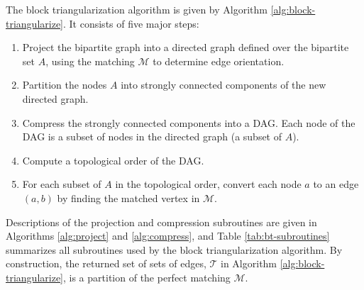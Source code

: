 \documentclass[smallextended]{svjour3}
\begin{document}
The block triangularization algorithm is given by Algorithm
\ref{alg:block-triangularize}. It consists of five major steps:
\begin{enumerate}
  \item Project the bipartite graph into a directed graph defined over the
    bipartite set $A$, using the matching $\mathcal{M}$ to determine edge orientation.
  \item Partition the nodes $A$ into strongly connected components of the new
    directed graph.
  \item Compress the strongly connected components into a DAG. Each node of the
    DAG is a subset of nodes in the directed graph (a subset of $A$).
  \item Compute a topological order of the DAG.
  \item For each subset of $A$ in the topological order, convert each node $a$
    to an edge $(a,b)$ by finding the matched vertex in $\mathcal{M}$.
\end{enumerate}
Descriptions of the projection and compression subroutines are given in
Algorithms \ref{alg:project} and \ref{alg:compress}, and Table
\ref{tab:bt-subroutines} summarizes all subroutines used by the block
triangularization algorithm.
By construction, the returned set of sets of edges, $\mathcal{T}$
in Algorithm \ref{alg:block-triangularize}, is a partition of the perfect
matching $\mathcal{M}$.

\begin{table}
  \centering
  \caption{Subroutines used by {\tt block\_triangularize} algorithm}
  \label{tab:bt-subroutines}
\end{table}
\end{document}

